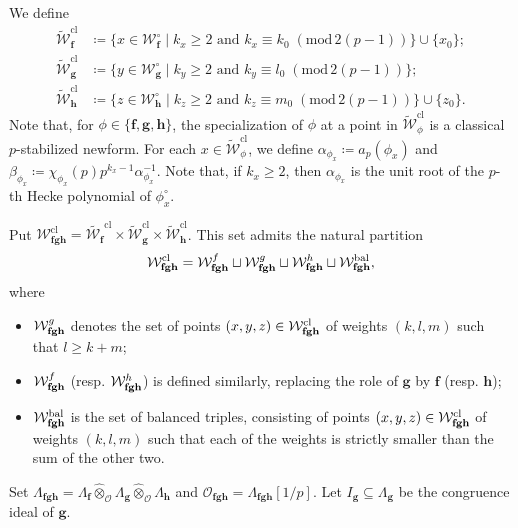 \documentclass[a4paper,11pt]{amsart}
\theoremstyle{plain}
\theoremstyle{definition}
\theoremstyle{remark}
\newcommand{\cl}{\mathcal}
\DeclareMathOperator{\bal}{bal}
\newcommand{\hf}{{\mathbf{f}}}
\newcommand{\hg}{{\mathbf{g}}}
\newcommand{\hh}{{\mathbf h}}
\numberwithin{equation}{section}
\begin{document}
We define
\begin{align*}
\tilde{\cl{W}}_{\hf}^{\mathrm{cl}}&\coloneqq \lbrace x\in \cl{W}_{\hf}^\circ \;\vert\; k_x\geq 2 \text{ and } k_x\equiv k_0\;(\mathrm{mod}\,2(p-1))\rbrace \cup \lbrace x_0\rbrace; \\ 
\tilde{\cl{W}}_{\hg}^{\mathrm{cl}}&\coloneqq \lbrace y\in \cl{W}_{\hg}^\circ \;\vert\; k_y\geq 2 \text{ and } k_y\equiv l_0 \;(\mathrm{mod}\,2(p-1))\rbrace; \\
\tilde{\cl{W}}_{\hh}^{\mathrm{cl}}&\coloneqq \lbrace z\in \cl{W}_{\hh}^\circ \;\vert\; k_z\geq 2 \text{ and } k_z\equiv m_0 \;(\mathrm{mod}\,2(p-1))\rbrace \cup \lbrace z_0\rbrace.
\end{align*}
Note that, for $\phi\in\lbrace \hf,\hg,\hh\rbrace$, the specialization of $\phi$ at a point in $\tilde{\cl{W}}_{\phi}^{\mathrm{cl}}$ is a classical $p$-stabilized newform. For each $x\in \tilde{\cl{W}}_{\phi}^{\mathrm{cl}}$, we define $\alpha_{\phi_x}\coloneqq a_p(\phi_x)$ and $\beta_{\phi_x}\coloneqq\chi_{\phi_x}(p)p^{k_x-1}\alpha_{\phi_x}^{-1}$. Note that, if $k_x\geq 2$, then $\alpha_{\phi_x}$ is the unit root of the $p$-th Hecke polynomial of $\phi_x^{\circ}$.



Put $\cl{W}_{\hf \hg \hh}^{\mathrm{cl}}=\tilde{\cl{W}_{\hf}}^{\mathrm{cl}}\times \tilde{\cl{W}}_{\hg}^{\mathrm{cl}}\times \tilde{\cl{W}}_{\hh}^{\mathrm{cl}}$. This set admits the natural partition
\[
\mathcal W_{{\bf fgh}}^{\mathrm{cl}} = \mathcal W_{{\bf fgh}}^{f} \sqcup \mathcal W_{{\bf fgh}}^{g} \sqcup \mathcal W_{{\bf fgh}}^{h} \sqcup \mathcal W_{{\bf fgh}}^{\bal},
\]
where
\begin{itemize}
\item $\mathcal W_{{\bf fgh}}^g$ denotes the set of points $(x,y,z) \in \mathcal W_{{\bf fgh}}^{\mathrm{cl}}$ of weights $(k,l,m)$ such that $l \geq k+m$;
\item $\mathcal W_{{\bf fgh}}^f$ (resp. $\mathcal W_{{\bf fgh}}^h$) is defined similarly, replacing the role of $\hg$ by $\hf$ (resp. $\hh$);
\item $\mathcal W_{{\bf fgh}}^{\bal}$ is the set of balanced triples, consisting of points $(x,y,z)\in \mathcal W_{{\bf fgh}}^{\mathrm{cl}}$ of weights $(k,l,m)$ such that each of the weights is strictly smaller than the sum of the other two.
\end{itemize}
Set $\Lambda_{\hf \hg \hh}=\Lambda_{\hf}\hat{\otimes}_{\cl{O}} \Lambda_{\hg}\hat{\otimes}_{\cl{O}} \Lambda_{\hh}$ and $\cl{O}_{\hf \hg \hh}=\Lambda_{\hf \hg \hh}[1/p]$. Let $I_\hg\subseteq \Lambda_\hg$ be the congruence ideal of $\hg$.
\end{document}
